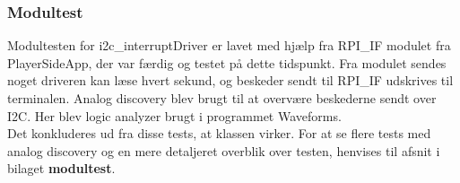 \documentclass[Rapport/RPi/RPI.tex]{subfiles}
\begin{document}
\subsubsection{Modultest}\label{sec:I2C_interruptDriver_modultest}
Modultesten for i2c\_interruptDriver er lavet med hjælp fra RPI\_IF modulet fra PlayerSideApp, der var færdig og testet på dette tidspunkt. Fra modulet sendes noget driveren kan læse hvert sekund, og beskeder sendt til RPI\_IF udskrives til terminalen. Analog discovery blev brugt til at overvære beskederne sendt over I2C. Her blev logic analyzer brugt i programmet Waveforms. \\

Det konkluderes ud fra disse tests, at klassen virker. For at se flere tests med analog discovery og en mere detaljeret overblik over testen, henvises til afsnit  i bilaget \textbf{modultest}.
\end{document}
